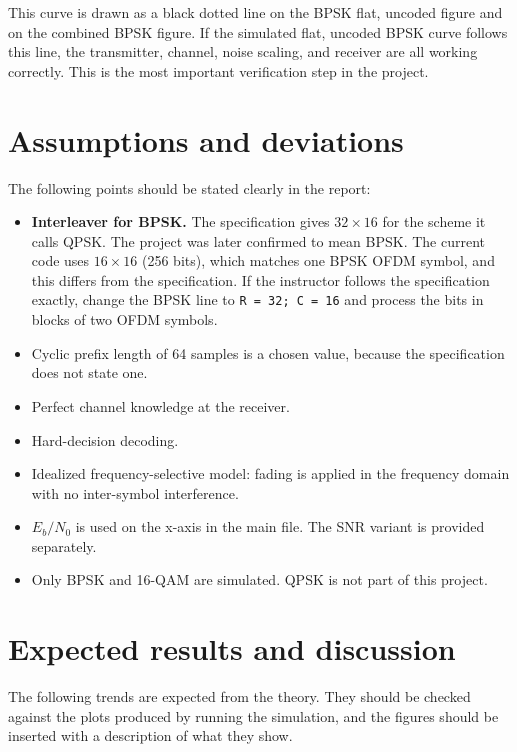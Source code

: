 \documentclass[11pt,a4paper]{article}
\begin{document}
This curve is drawn as a black dotted line on the BPSK flat, uncoded figure and on the combined BPSK figure. If the simulated flat, uncoded BPSK curve follows this line, the transmitter, channel, noise scaling, and receiver are all working correctly. This is the most important verification step in the project.

\section{Assumptions and deviations}
\label{sec:deviations}

The following points should be stated clearly in the report:
\begin{itemize}[leftmargin=*]
  \item \textbf{Interleaver for BPSK.} The specification gives $32 \times 16$ for the scheme it calls QPSK. The project was later confirmed to mean BPSK. The current code uses $16 \times 16$ (256 bits), which matches one BPSK OFDM symbol, and this differs from the specification. If the instructor follows the specification exactly, change the BPSK line to \texttt{R = 32; C = 16} and process the bits in blocks of two OFDM symbols.
  \item Cyclic prefix length of 64 samples is a chosen value, because the specification does not state one.
  \item Perfect channel knowledge at the receiver.
  \item Hard-decision decoding.
  \item Idealized frequency-selective model: fading is applied in the frequency domain with no inter-symbol interference.
  \item $E_b/N_0$ is used on the x-axis in the main file. The SNR variant is provided separately.
  \item Only BPSK and 16-QAM are simulated. QPSK is not part of this project.
\end{itemize}

\section{Expected results and discussion}

The following trends are expected from the theory. They should be checked against the plots produced by running the simulation, and the figures should be inserted with a description of what they show.
\end{document}
